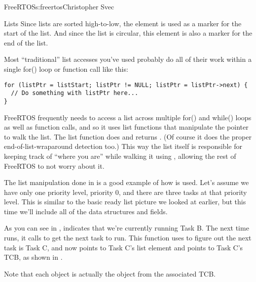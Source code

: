 \begin{aosachapter}{FreeRTOS}{s:freertos}{Christopher Svec}
\begin{aosasect1}{Lists}
Since lists are sorted high-to-low, the  element is
used as a marker for the start of the list.  And since the list is
circular, this  element is also a marker for the end of
the list.

\pagebreak %
Most ``traditional'' list accesses you've used probably do all of
their work within a single for() loop or function call like this:

\begin{verbatim}
for (listPtr = listStart; listPtr != NULL; listPtr = listPtr->next) {
  // Do something with listPtr here...
}
\end{verbatim}

FreeRTOS frequently needs to access a list across multiple for() and
while() loops as well as function calls, and so it uses list functions
that manipulate the  pointer to walk the list. The list
function  does  and returns . (Of
course it does the proper end-of-list-wraparound detection too.) This
way the list itself is responsible for keeping track of ``where you
are'' while walking it using , allowing the rest of
FreeRTOS to not worry about it.


The  list manipulation done in
 is a good example of how  is
used. Let's assume we have only one priority level, priority 0, and
there are three tasks at that priority level. This is similar to the
basic ready list picture we looked at earlier, but this time we'll
include all of the data structures and fields.

As you can see in , 
indicates that we're currently running Task B.  The next time
 runs, it calls
 to get the next task to
run. This function uses  to figure
out the next task is Task C, and now  points to Task C's
list element and  points to Task C's TCB, as shown in
.

Note that each  object is actually the
 object from the associated TCB.


\end{aosasect1}
\end{aosachapter}
